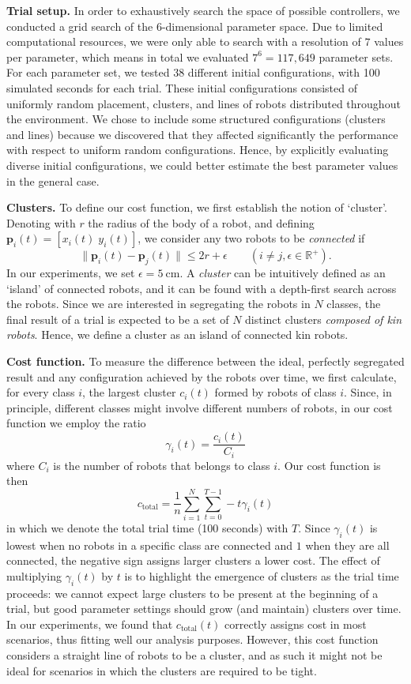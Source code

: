 \documentclass[conference]{IEEEtran}
\newcommand{\myparagraph}[1]{\textbf{#1.}}
\renewcommand{\vec}[1]{\ensuremath{\mathbf{#1}}}
\begin{document}
\myparagraph{Trial setup}
In order to exhaustively search the space of possible controllers, we conducted
a grid search of the 6-dimensional parameter space. Due to limited computational
resources, we were only able to search with a resolution of $7$ values per
parameter, which means in total we evaluated $7^6=117,649$ parameter sets. For
each parameter set, we tested 38 different initial configurations, with 100
simulated seconds for each trial. These initial configurations consisted of
uniformly random placement, clusters, and lines of robots distributed throughout
the environment. We chose to include some structured configurations (clusters
and lines) because we discovered that they affected significantly the
performance with respect to uniform random configurations. Hence, by explicitly
evaluating diverse initial configurations, we could better estimate the best
parameter values in the general case.

\myparagraph{Clusters}
To define our cost function, we first establish the notion of
`cluster'. Denoting with $r$ the radius of the body of a robot, and defining
$\vec{p}_i(t) = [x_i(t)\;y_i(t)]$, we consider any two robots to be
\emph{connected} if
$$
\lVert\vec{p}_i(t) - \vec{p}_j(t)\rVert \le 2r + \epsilon \qquad (i \ne j, \epsilon \in \mathbb{R}^+).
$$
In our experiments, we set $\epsilon = \SI{5}{\centi\meter}$.  A
\emph{cluster} can be intuitively defined as an `island' of connected
robots, and it can be found with a depth-first search across the
robots. Since we are interested in segregating the robots in $N$
classes, the final result of a trial is expected to be a set of $N$
distinct clusters \emph{composed of kin robots}. Hence, we define a
cluster as an island of connected kin robots.

\myparagraph{Cost function}
To measure the difference between the ideal, perfectly segregated result and any
configuration achieved by the robots over time, we first calculate, for every
class $i$, the largest cluster $c_i(t)$ formed by robots of class $i$.  Since,
in principle, different classes might involve different numbers of robots, in
our cost function we employ the ratio
$$
\gamma_i(t) = \frac{c_i(t)}{C_i}
$$
where $C_i$ is the number of robots that belongs to class $i$. Our cost function
is then
\begin{equation}
  \label{eq:cost_function}
  c_{\text{total}} =  \frac{1}{n}\sum_{i=1}^N\sum_{t=0}^{T-1} -t \gamma_i(t)
\end{equation}
in which we denote the total trial time (100 seconds) with $T$. Since
$\gamma_i(t)$ is lowest when no robots in a specific class are connected and $1$
when they are all connected, the negative sign assigns larger clusters a lower
cost. The effect of multiplying $\gamma_i(t)$ by $t$ is to highlight the
emergence of clusters as the trial time proceeds: we cannot expect large
clusters to be present at the beginning of a trial, but good parameter settings
should grow (and maintain) clusters over time. In our experiments, we found that
$c_{\text{total}}(t)$ correctly assigns cost in most scenarios, thus fitting
well our analysis purposes. However, this cost function considers a straight
line of robots to be a cluster, and as such it might not be ideal for scenarios
in which the clusters are required to be tight.
\end{document}

